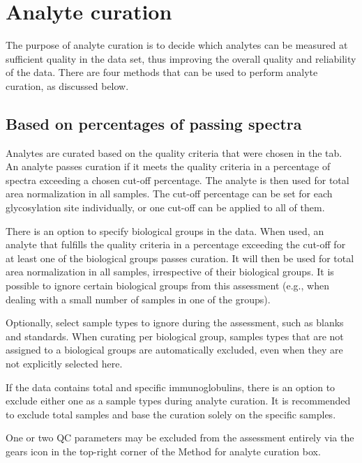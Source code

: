 \graphicspath{ {./images/4_Analyte_curation} }
\newpage

\section{Analyte curation}
The purpose of analyte curation is to decide which analytes can be measured at sufficient quality in the data set, thus improving the overall quality and reliability of the data.
There are four methods that can be used to perform analyte curation, as discussed below. 

\subsection{Based on percentages of passing spectra}
Analytes are curated based on the quality criteria that were chosen in the  tab.
An analyte passes curation if it meets the quality criteria in a percentage of spectra exceeding a chosen cut-off percentage.
The analyte is then used for total area normalization in all samples. 
The cut-off percentage can be set for each glycosylation site individually, or one cut-off can be applied to all of them.

There is an option to specify biological groups in the data. 
When used, an analyte that fulfills the quality criteria in a percentage exceeding the cut-off for at least one of the biological groups passes curation.
It will then be used for total area normalization in all samples, irrespective of their biological groups.
It is possible to ignore certain biological groups from this assessment (e.g., when dealing with a small number of samples in one of the groups).

Optionally, select sample types to ignore during the assessment, such as blanks and standards.
When curating per biological group, samples types that are not assigned to a biological groups are automatically excluded, even when they are not explicitly selected here.

\begin{optionalbox}
	If the data contains total and specific immunoglobulins, there is an option to exclude either one as a sample types during analyte curation.
	It is recommended to exclude total samples and base the curation solely on the specific samples.
\end{optionalbox}

One or two QC parameters may be excluded from the assessment entirely via the gears icon in the top-right corner of the \textsf{Method for analyte curation} box.

